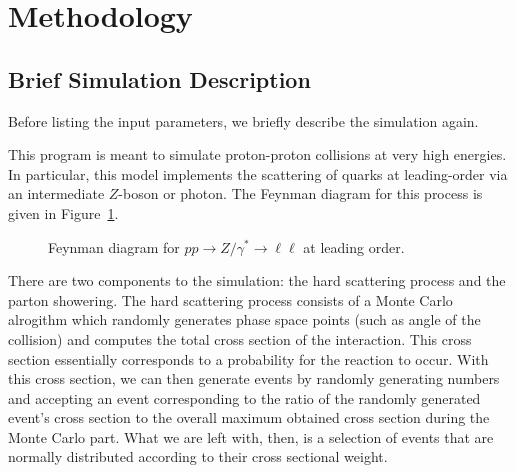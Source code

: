 \section{Methodology}

\subsection{Brief Simulation Description}

Before listing the input parameters, we briefly describe the simulation again.

This program is meant to simulate proton-proton collisions at very high energies. In particular, this model implements the scattering of quarks at leading-order via an intermediate $Z$-boson or photon. The Feynman diagram for this process is given in Figure~\ref{fig:main-diagram}.

\begin{figure}[ht]
  \centering

  
  \caption{Feynman diagram for $pp \rightarrow Z/\gamma^* \rightarrow \ell\ell$ at leading order.}
  \label{fig:main-diagram}
\end{figure}


There are two components to the simulation: the hard scattering process and the parton showering. The hard scattering process consists of a Monte Carlo alrogithm which randomly generates phase space points (such as angle of the collision) and computes the total cross section of the interaction. This cross section essentially corresponds to a probability for the reaction to occur. With this cross section, we can then generate events by randomly generating numbers and accepting an event corresponding to the ratio of the randomly generated event's cross section to the overall maximum obtained cross section during the Monte Carlo part. What we are left with, then, is a selection of events that are normally distributed according to their cross sectional weight.

